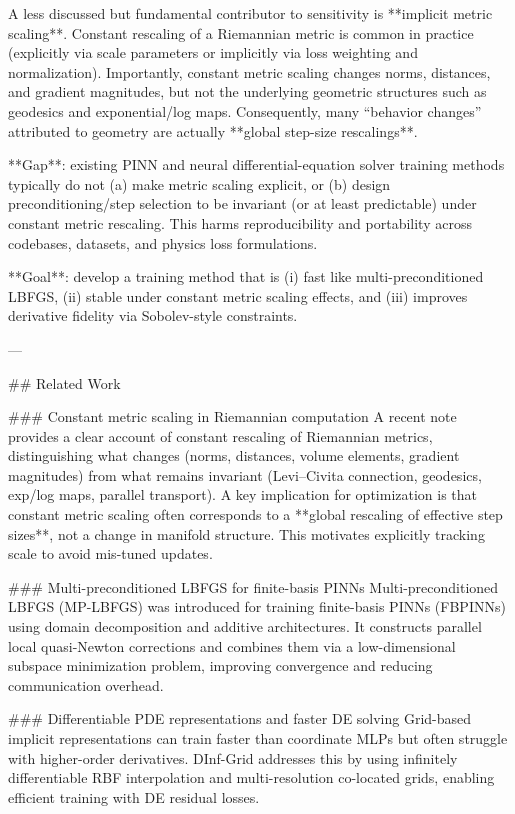 A less discussed but fundamental contributor to sensitivity is **implicit metric scaling**. Constant rescaling of a Riemannian metric is common in practice (explicitly via scale parameters or implicitly via loss weighting and normalization). Importantly, constant metric scaling changes norms, distances, and gradient magnitudes, but not the underlying geometric structures such as geodesics and exponential/log maps. Consequently, many “behavior changes” attributed to geometry are actually **global step-size rescalings**.

**Gap**: existing PINN and neural differential-equation solver training methods typically do not (a) make metric scaling explicit, or (b) design preconditioning/step selection to be invariant (or at least predictable) under constant metric rescaling. This harms reproducibility and portability across codebases, datasets, and physics loss formulations.

**Goal**: develop a training method that is (i) fast like multi-preconditioned LBFGS, (ii) stable under constant metric scaling effects, and (iii) improves derivative fidelity via Sobolev-style constraints.

---

## Related Work  

### Constant metric scaling in Riemannian computation  
A recent note provides a clear account of constant rescaling of Riemannian metrics, distinguishing what changes (norms, distances, volume elements, gradient magnitudes) from what remains invariant (Levi–Civita connection, geodesics, exp/log maps, parallel transport). A key implication for optimization is that constant metric scaling often corresponds to a **global rescaling of effective step sizes**, not a change in manifold structure. This motivates explicitly tracking scale to avoid mis-tuned updates.

### Multi-preconditioned LBFGS for finite-basis PINNs  
Multi-preconditioned LBFGS (MP-LBFGS) was introduced for training finite-basis PINNs (FBPINNs) using domain decomposition and additive architectures. It constructs parallel local quasi-Newton corrections and combines them via a low-dimensional subspace minimization problem, improving convergence and reducing communication overhead.

### Differentiable PDE representations and faster DE solving  
Grid-based implicit representations can train faster than coordinate MLPs but often struggle with higher-order derivatives. DInf-Grid addresses this by using infinitely differentiable RBF interpolation and multi-resolution co-located grids, enabling efficient training with DE residual losses.

